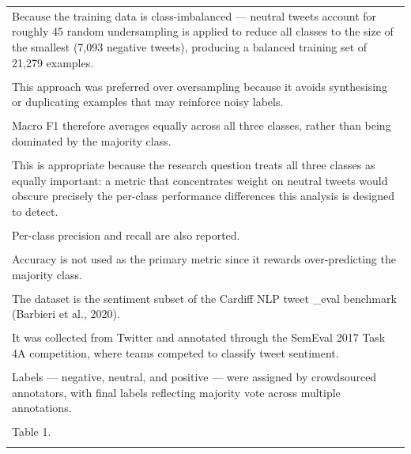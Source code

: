 \documentclass[11pt]{article}
\begin{document}
\begin{longtable}{|p{\dimexpr\linewidth-2\tabcolsep-2\arrayrulewidth\relax}|}
\hline
\rule{0pt}{3.5cm} \\
\hline
Because the training data is class-imbalanced --- neutral tweets account for roughly 45 random undersampling is applied to reduce all classes to the size of the smallest (7,093 negative tweets), producing a balanced training set of 21,279 examples. \\[2pt]
\hline
\rule{0pt}{3.5cm} \\
\hline
This approach was preferred over oversampling because it avoids synthesising or duplicating examples that may reinforce noisy labels. \\[2pt]
\hline
\rule{0pt}{3.5cm} \\
\hline
Macro F1 therefore averages equally across all three classes, rather than being dominated by the majority class. \\[2pt]
\hline
\rule{0pt}{3.5cm} \\
\hline
This is appropriate because the research question treats all three classes as equally important: a metric that concentrates weight on neutral tweets would obscure precisely the per-class performance differences this analysis is designed to detect. \\[2pt]
\hline
\rule{0pt}{3.5cm} \\
\hline
Per-class precision and recall are also reported. \\[2pt]
\hline
\rule{0pt}{3.5cm} \\
\hline
Accuracy is not used as the primary metric since it rewards over-predicting the majority class. \\[2pt]
\hline
\rule{0pt}{3.5cm} \\
\hline
The dataset is the sentiment subset of the Cardiff NLP tweet \_eval benchmark (Barbieri et al., 2020). \\[2pt]
\hline
\rule{0pt}{3.5cm} \\
\hline
It was collected from Twitter and annotated through the SemEval 2017 Task 4A competition, where teams competed to classify tweet sentiment. \\[2pt]
\hline
\rule{0pt}{3.5cm} \\
\hline
Labels --- negative, neutral, and positive --- were assigned by crowdsourced annotators, with final labels reflecting majority vote across multiple annotations. \\[2pt]
\hline
\rule{0pt}{3.5cm} \\
\hline
Table 1. \\[2pt]
\hline
\rule{0pt}{3.5cm} \\

\end{longtable}
\end{document}

